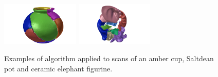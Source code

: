 \documentclass[acmlarge,screen,dvipsnames]{acmart}
\begin{document}
\begin{figure}[htb]
  \includegraphics[width=0.33\textwidth]{images/saltdeanpuzzle4}%
  \includegraphics[width=0.33\textwidth]{images/elephantpuzzle4}\\[-0.5\baselineskip]
  \caption{\label{fig:three-shapes-with-different-fractures}%
    Examples of algorithm applied to scans of an amber cup, Saltdean pot and
    ceramic elephant figurine.\vspace*{-1.0\baselineskip}}
\end{figure}
\end{document}
